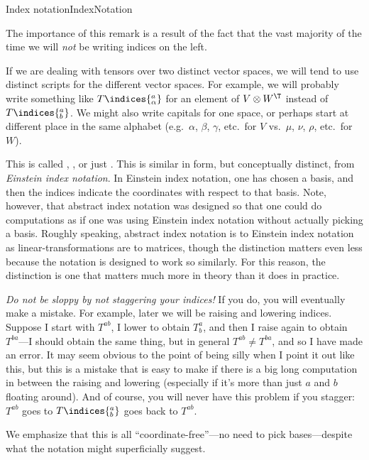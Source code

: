 \begin{ntn}{Index notation}{IndexNotation}
\begin{rmk}
		The importance of this remark is a result of the fact that the vast majority of the time we will \emph{not} be writing indices on the left.
	\end{rmk}
	\begin{rmk}
		If we are dealing with tensors over two distinct vector spaces, we will tend to use distinct scripts for the different vector spaces.  For example, we will probably write something like $T\indices{^a_{\alpha}}$ for an element of $V\otimes W^{\T}$ instead of $T\indices{^a_b}$.  We might also write capitals for one space, or perhaps start at different place in the same alphabet (e.g.~$\alpha$, $\beta$, $\gamma$, etc.~for $V$ vs.~$\mu$, $\nu$, $\rho$, etc.~for $W$).
	\end{rmk}
	\begin{rmk}
		This is called , , or just .  This is similar in form, but conceptually distinct, from \emph{Einstein index notation}.  In Einstein index notation, one has chosen a basis, and then the indices indicate the coordinates with respect to that basis.  Note, however, that abstract index notation was designed so that one could do computations as if one was using Einstein index notation without actually picking a basis.  Roughly speaking, abstract index notation is to Einstein index notation as linear-transformations are to matrices, though the distinction matters even less because the notation is designed to work so similarly.  For this reason, the distinction is one that matters much more in theory than it does in practice.
	\end{rmk}
	\begin{rmk}
		\emph{Do not be sloppy by not staggering your indices!}  If you do, you will eventually make a mistake.  For example, later we will be raising and lowering indices.  Suppose I start with $T^{ab}$, I lower to obtain $T_b^a$, and then I raise again to obtain $T^{ba}$---I should obtain the same thing, but in general $T^{ab}\neq T^{ba}$, and so I have made an error.  It may seem obvious to the point of being silly when I point it out like this, but this is a mistake that is easy to make if there is a big long computation in between the raising and lowering (especially if it's more than just $a$ and $b$ floating around).  And of course, you will never have this problem if you stagger:  $T^{ab}$ goes to $T\indices{^a_b}$ goes back to $T^{ab}$.
	\end{rmk}
	\begin{rmk}
		We emphasize that this is all ``coordinate-free''---no need to pick bases---despite what the notation might superficially suggest.
	\end{rmk}
\end{ntn}

